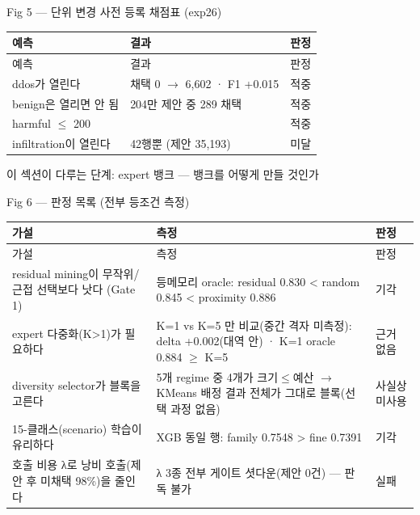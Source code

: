 Fig 5 — 단위 변경 사전 등록 채점표 (exp26)

\begingroup
\footnotesize
\begin{longtable}{>{\raggedright\arraybackslash}p{}>{\raggedright\arraybackslash}p{}>{\raggedright\arraybackslash}p{}}
\toprule
예측 & 결과 & 판정 \\ \midrule
\endfirsthead
예측 & 결과 & 판정 \\ \midrule
\endhead
{}ddos가 열린다 & 채택 0  \ensuremath{\rightarrow}  6,602 · F1 +\allowbreak{}0.015 & 적중 \\
{}benign은 열리면 안 됨 & 204만 제안 중 289 채택 & 적중 \\
{}harmful \ensuremath{\leq} 200 & 56 & 적중 \\
{}infiltration이 열린다 & 42행뿐 (제안 35,193) & 미달 \\
\bottomrule
\end{longtable}
\endgroup
이 섹션이 다루는 단계: expert 뱅크 — 뱅크를 어떻게 만들 것인가

Fig 6 — 판정 목록 (전부 등조건 측정)

\begingroup
\footnotesize
\begin{longtable}{>{\raggedright\arraybackslash}p{}>{\raggedright\arraybackslash}p{}>{\raggedright\arraybackslash}p{}}
\toprule
가설 & 측정 & 판정 \\ \midrule
\endfirsthead
가설 & 측정 & 판정 \\ \midrule
\endhead
{}residual mining이 무작위/\allowbreak{}근접 선택보다 낫다 (Gate 1) & 등메모리 oracle: residual 0.830 < random 0.845 < proximity 0.886 & 기각 \\
{}expert 다중화(K>1)가 필요하다 & K=\allowbreak{}1 vs K=\allowbreak{}5 만 비교(중간 격자 미측정): delta +\allowbreak{}0.002(대역 안) · K=\allowbreak{}1 oracle 0.884 \ensuremath{\geq} K=\allowbreak{}5 & 근거 없음 \\
{}diversity selector가 블록을 고른다 & 5개 regime 중 4개가 크기\ensuremath{\leq}예산  \ensuremath{\rightarrow}  KMeans 배정 결과 전체가 그대로 블록(선택 과정 없음) & 사실상 미사용 \\
{}15-클래스(scenario) 학습이 유리하다 & XGB 동일 행: family 0.7548 > fine 0.7391 & 기각 \\
{}호출 비용 λ로 낭비 호출(제안 후 미채택 98\%)을 줄인다 & λ 3종 전부 게이트 셧다운(제안 0건) — 판독 불가 & 실패 \\
\bottomrule
\end{longtable}
\endgroup

